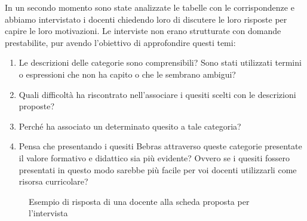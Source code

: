 \documentclass[12pt]{report}
\begin{document}
In un secondo momento sono state analizzate le tabelle con le corrispondenze e abbiamo intervistato i docenti chiedendo loro di discutere le loro risposte per capire le loro motivazioni. Le interviste non erano strutturate con domande prestabilite, pur avendo l'obiettivo di approfondire questi temi:

\begin{enumerate}[label=(\arabic*)]
	\item Le descrizioni delle categorie sono comprensibili? Sono stati utilizzati termini o espressioni che non ha capito o che le sembrano ambigui? 
	
	\item Quali difficoltà ha riscontrato nell'associare i quesiti scelti con le descrizioni proposte?
	
	\item Perché ha associato un determinato quesito a tale categoria?
	
	\item Pensa che presentando i quesiti Bebras attraverso queste categorie presentate il valore formativo e didattico sia più evidente? Ovvero se i quesiti fossero presentati in questo modo sarebbe più facile per voi docenti utilizzarli come risorsa curricolare?
\end{enumerate}


\begin{figure}[htb]
	\centering
	\caption{Esempio di risposta di una docente alla scheda proposta per l'intervista}\label{classificazione_insegnanti}
\end{figure}
\end{document}
